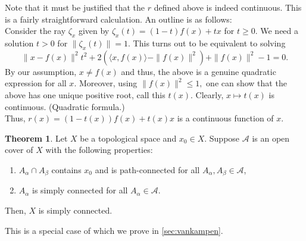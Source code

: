 \documentclass[12pt]{article}
\theoremstyle{definition}
\newtheorem{thm}{Theorem}
\numberwithin{thm}{section}
\begin{document}
Note that it must be justified that the $r$ defined above is indeed continuous. This is a fairly straightforward calculation. An outline is as follows:\\
Consider the ray $\zeta_x$ given by $\zeta_x(t) = (1 - t)f(x) + tx$ for $t \ge 0.$ We need a solution $t > 0$ for $\|\zeta_x(t)\| = 1.$ This turns out to be equivalent to solving
\begin{equation*} 
	\|x - f(x)\|^2 t^2 + 2(\langle x, f(x)\rangle - \|f(x)\|^2) + \|f(x)\|^2 - 1 = 0.
\end{equation*} 
By our assumption, $x \neq f(x)$ and thus, the above is a genuine quadratic expression for all $x.$ Moreover, using $\|f(x)\|^2 \le 1,$ one can show that the above has one unique positive root, call this $t(x).$ Clearly, $x \mapsto t(x)$ is continuous. (Quadratic formula.)\\
Thus, $r(x) = (1 - t(x))f(x) + t(x)x$ is a continuous function of $x.$

\begin{thm} \label{thm:vankampenspecial}
	Let $X$ be a topological space and $x_0 \in X.$ Suppose $\mathcal{A}$ is an open cover of $X$ with the following properties:
	\begin{enumerate}
		\item $A_\alpha \cap A_\beta$ contains $x_0$ and is path-connected for all $A_\alpha, A_\beta \in \mathcal{A}$,
		\item $A_\alpha$ is simply connected for all $A_\alpha \in \mathcal{A}.$
	\end{enumerate}
	Then, $X$ is simply connected.
\end{thm}

This is a special case of  which we prove in \cref{sec:vankampen}.
\end{document}
